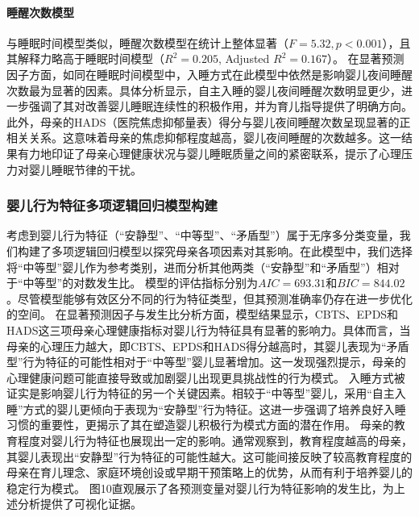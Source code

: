 \documentclass[withoutpreface,bwprint]{cumcmthesis}
\begin{document}
\paragraph{睡醒次数模型}
与睡眠时间模型类似，睡醒次数模型在统计上整体显著（$F=5.32, p < 0.001$），且其解释力略高于睡眠时间模型（$R^2 = 0.205$, Adjusted $R^2 = 0.167$）。
在显著预测因子方面，如同在睡眠时间模型中，入睡方式在此模型中依然是影响婴儿夜间睡醒次数最为显著的因素。具体分析显示，自主入睡的婴儿夜间睡醒次数明显更少，进一步强调了其对改善婴儿睡眠连续性的积极作用，并为育儿指导提供了明确方向。此外，母亲的HADS（医院焦虑抑郁量表）得分与婴儿夜间睡醒次数呈现显著的正相关关系。这意味着母亲的焦虑抑郁程度越高，婴儿夜间睡醒的次数越多。这一结果有力地印证了母亲心理健康状况与婴儿睡眠质量之间的紧密联系，提示了心理压力对婴儿睡眠节律的干扰。

\subsubsection{婴儿行为特征多项逻辑回归模型构建}
考虑到婴儿行为特征（“安静型”、“中等型”、“矛盾型”）属于无序多分类变量，我们构建了多项逻辑回归模型以探究母亲各项因素对其影响。在此模型中，我们选择将“中等型”婴儿作为参考类别，进而分析其他两类（“安静型”和“矛盾型”）相对于“中等型”的对数发生比。
模型的评估指标分别为$AIC = 693.31$和$BIC = 844.02$。尽管模型能够有效区分不同的行为特征类型，但其预测准确率仍存在进一步优化的空间。
在显著预测因子与发生比分析方面，模型结果显示，CBTS、EPDS和HADS这三项母亲心理健康指标对婴儿行为特征具有显著的影响力。具体而言，当母亲的心理压力越大，即CBTS、EPDS和HADS得分越高时，其婴儿表现为“矛盾型”行为特征的可能性相对于“中等型”婴儿显著增加。这一发现强烈提示，母亲的心理健康问题可能直接导致或加剧婴儿出现更具挑战性的行为模式。
入睡方式被证实是影响婴儿行为特征的另一个关键因素。相较于“中等型”婴儿，采用“自主入睡”方式的婴儿更倾向于表现为“安静型”行为特征。这进一步强调了培养良好入睡习惯的重要性，更揭示了其在塑造婴儿积极行为模式方面的潜在作用。
母亲的教育程度对婴儿行为特征也展现出一定的影响。通常观察到，教育程度越高的母亲，其婴儿表现出“安静型”行为特征的可能性越大。这可能间接反映了较高教育程度的母亲在育儿理念、家庭环境创设或早期干预策略上的优势，从而有利于培养婴儿的稳定行为模式。
图10直观展示了各预测变量对婴儿行为特征影响的发生比，为上述分析提供了可视化证据。
\end{document}
